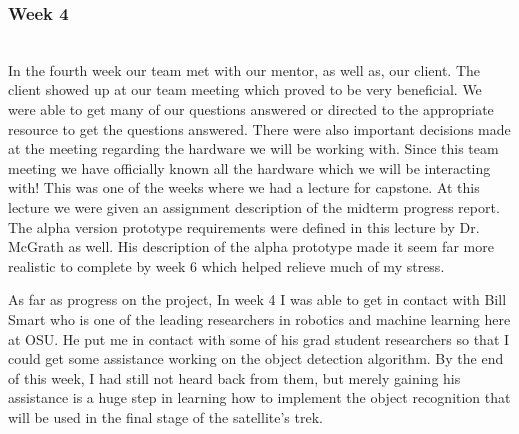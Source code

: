 \documentclass[10pt,letterpaper,onecolumn,draftclsnofoot,journal]{IEEEtran}
\begin{document}
\subsubsection{Week 4}\hspace*{\fill}\\
In the fourth week our team met with our mentor, as well as, our client. The client showed up at our team meeting which proved to be very beneficial. We were able to get many of our questions answered or directed to the appropriate resource to get the questions answered. There were also important decisions made at the meeting regarding the hardware we will be working with. Since this team meeting we have officially known all the hardware which we will be interacting with! This was one of the weeks where we had a lecture for capstone. At this lecture we were given an assignment description of the midterm progress report. The alpha version prototype requirements were defined in this lecture by Dr. McGrath as well. His description of the alpha prototype made it seem far more realistic to complete by week 6 which helped relieve much of my stress.\vspace{.3cm}
\par
As far as progress on the project, In week 4 I was able to get in contact with Bill Smart who is one of the leading researchers in robotics and machine learning here at OSU. He put me in contact with some of his grad student researchers so that I could get some assistance working on the object detection algorithm. By the end of this week, I had still not heard back from them, but merely gaining his assistance is a huge step in learning how to implement the object recognition that will be used in the final stage of the satellite's trek.\vspace{.3cm}
\par
\end{document}
